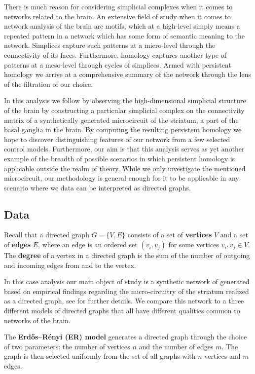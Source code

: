There is much reason for considering simplicial complexes when it comes to networks related to the brain. An extensive field of study when it comes to network analysis of the brain are motifs, which at a high-level simply means a repeated pattern in a network which has some form of semantic meaning to the network. Simplices capture such patterns at a micro-level through the connectivity of its faces. Furthermore, homology captures another type of patterns at a meso-level through cycles of simplices. Armed with persistent homology we arrive at a comprehensive summary of the network through the lens of the filtration of our choice.

In this analysis we follow \cite{reimann} by observing the high-dimensional simplicial structure of the brain by constructing a particular simplicial complex on the connectivity matrix of a synthetically generated microcircuit of the striatum, a part of the basal ganglia in the brain. By computing the resulting persistent homology we hope to discover distinguishing features of our network from a few selected control models. Furthermore, our aim is that this analysis serves as yet another example of the breadth of possible scenarios in which persistent homology is applicable outside the realm of theory. While we only investigate the mentioned microcircuit, our methodology is general enough for it to be applicable in any scenario where we data can be interpreted as directed graphs.

\subsection{Data}

Recall that a directed graph $G=\{V,E\}$ consists of a set of \textbf{vertices} $V$ and a set of \textbf{edges} $E$, where an edge is an ordered set $(v_{i},v_{j})$ for some vertices $v_{i},v_{j} \in V$. The \textbf{degree} of a vertex in a directed graph is the sum of the number of outgoing and incoming edges from and to the vertex.


In this case analysis our main object of study is a synthetic network of generated based on empirical findings regarding the micro-circuitry of the striatum realized as a directed graph, see \cite{Hjorth202000671} for further details. We compare this network to a three different models of directed graphs that all have different qualities common to networks of the brain.

\begin{definition}
The \textbf{Erdős–Rényi (ER) model} generates a directed graph through the choice of two parameters: the number of vertices $n$ and the number of edges $m$. The graph is then selected uniformly from the set of all graphs with $n$ vertices and $m$ edges.
\end{definition}

